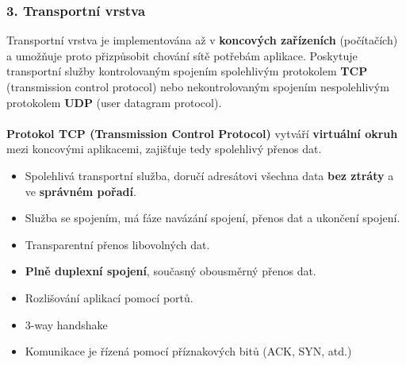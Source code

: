 \subsubsection*{3. Transportní vrstva}
Transportní vrstva je implementována až v \textbf{koncových zařízeních} (počítačích) a umožňuje proto přizpůsobit chování sítě potřebám aplikace. Poskytuje transportní služby kontrolovaným spojením spolehlivým protokolem \textbf{TCP} (transmission control protocol) nebo nekontrolovaným spojením nespolehlivým protokolem \textbf{UDP} (user datagram protocol).
\\\\
\textbf{Protokol TCP (Transmission Control Protocol)} vytváří \textbf{virtuální okruh} mezi koncovými aplikacemi, zajišťuje tedy spolehlivý přenos dat.
\begin{itemize}
	\item Spolehlivá transportní služba, doručí adresátovi všechna data \textbf{bez ztráty} a ve \textbf{správném pořadí}.
	\item Služba se spojením, má fáze navázání spojení, přenos dat a ukončení spojení.
	\item Transparentní přenos libovolných dat.
	\item \textbf{Plně duplexní spojení}, současný obousměrný přenos dat.
	\item Rozlišování aplikací pomocí portů.
	\item 3-way handshake
	\item Komunikace je řízená pomocí příznakových bitů (ACK, SYN, atd.)
\end{itemize}
\noindent{}

